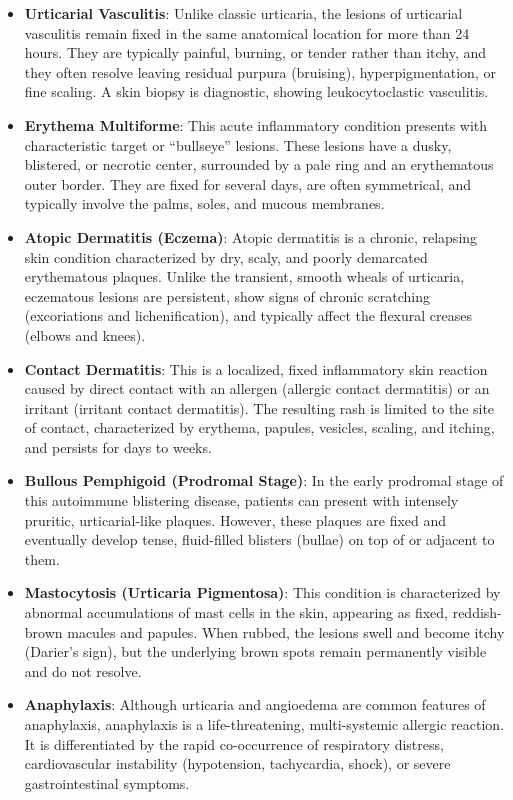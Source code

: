 \begin{itemize}
    \item \textbf{Urticarial Vasculitis}: Unlike classic urticaria, the lesions of urticarial vasculitis remain fixed in the same anatomical location for more than 24 hours. They are typically painful, burning, or tender rather than itchy, and they often resolve leaving residual purpura (bruising), hyperpigmentation, or fine scaling. A skin biopsy is diagnostic, showing leukocytoclastic vasculitis.
    \item \textbf{Erythema Multiforme}: This acute inflammatory condition presents with characteristic target or ``bullseye'' lesions. These lesions have a dusky, blistered, or necrotic center, surrounded by a pale ring and an erythematous outer border. They are fixed for several days, are often symmetrical, and typically involve the palms, soles, and mucous membranes.
    \item \textbf{Atopic Dermatitis (Eczema)}: Atopic dermatitis is a chronic, relapsing skin condition characterized by dry, scaly, and poorly demarcated erythematous plaques. Unlike the transient, smooth wheals of urticaria, eczematous lesions are persistent, show signs of chronic scratching (excoriations and lichenification), and typically affect the flexural creases (elbows and knees).
    \item \textbf{Contact Dermatitis}: This is a localized, fixed inflammatory skin reaction caused by direct contact with an allergen (allergic contact dermatitis) or an irritant (irritant contact dermatitis). The resulting rash is limited to the site of contact, characterized by erythema, papules, vesicles, scaling, and itching, and persists for days to weeks.
    \item \textbf{Bullous Pemphigoid (Prodromal Stage)}: In the early prodromal stage of this autoimmune blistering disease, patients can present with intensely pruritic, urticarial-like plaques. However, these plaques are fixed and eventually develop tense, fluid-filled blisters (bullae) on top of or adjacent to them.
    \item \textbf{Mastocytosis (Urticaria Pigmentosa)}: This condition is characterized by abnormal accumulations of mast cells in the skin, appearing as fixed, reddish-brown macules and papules. When rubbed, the lesions swell and become itchy (Darier's sign), but the underlying brown spots remain permanently visible and do not resolve.
    \item \textbf{Anaphylaxis}: Although urticaria and angioedema are common features of anaphylaxis, anaphylaxis is a life-threatening, multi-systemic allergic reaction. It is differentiated by the rapid co-occurrence of respiratory distress, cardiovascular instability (hypotension, tachycardia, shock), or severe gastrointestinal symptoms.
\end{itemize}

